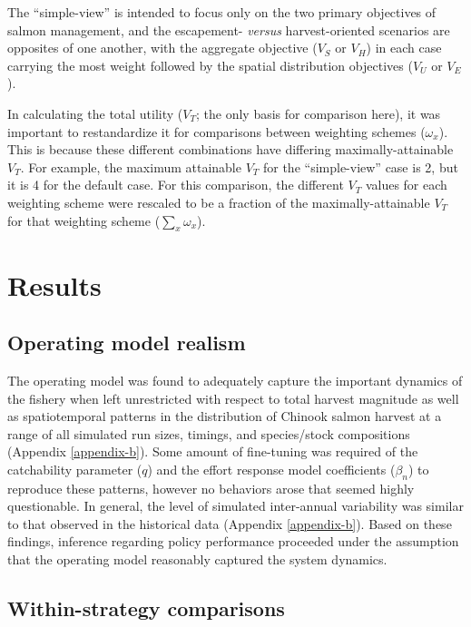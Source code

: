 \documentclass[12pt,]{book}
\theoremstyle{definition}
\theoremstyle{definition}
\theoremstyle{definition}
\theoremstyle{remark}
\begin{document}
\noindent
The ``simple-view'' is intended to focus only on the two primary
objectives of salmon management, and the escapement- \emph{versus}
harvest-oriented scenarios are opposites of one another, with the
aggregate objective (\(V_S\) or \(V_H\)) in each case carrying the most
weight followed by the spatial distribution objectives (\(V_U\) or
\(V_E\)).

In calculating the total utility (\(V_T\); the only basis for comparison
here), it was important to restandardize it for comparisons between
weighting schemes (\(\omega_x\)). This is because these different
combinations have differing maximally-attainable \(V_T\). For example,
the maximum attainable \(V_T\) for the ``simple-view'' case is 2, but it
is 4 for the default case. For this comparison, the different \(V_T\)
values for each weighting scheme were rescaled to be a fraction of the
maximally-attainable \(V_T\) for that weighting scheme
(\(\sum_x \omega_x\)).

\section{Results}\label{results-1}

\subsection{Operating model realism}\label{operating-model-realism}

\noindent
The operating model was found to adequately capture the important
dynamics of the fishery when left unrestricted with respect to total
harvest magnitude as well as spatiotemporal patterns in the distribution
of Chinook salmon harvest at a range of all simulated run sizes,
timings, and species/stock compositions (Appendix \ref{appendix-b}).
Some amount of fine-tuning was required of the catchability parameter
(\(q\)) and the effort response model coefficients (\(\beta_n\)) to
reproduce these patterns, however no behaviors arose that seemed highly
questionable. In general, the level of simulated inter-annual
variability was similar to that observed in the historical data
(Appendix \ref{appendix-b}). Based on these findings, inference
regarding policy performance proceeded under the assumption that the
operating model reasonably captured the system dynamics.

\subsection{Within-strategy
comparisons}\label{within-strategy-comparisons-1}
\end{document}
